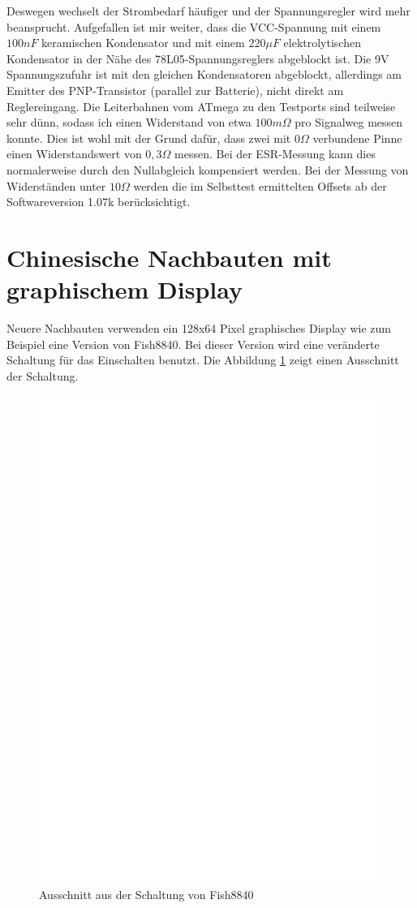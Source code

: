 Deswegen wechselt der Strombedarf häufiger und der Spannungsregler wird mehr beansprucht.
Aufgefallen ist mir weiter, dass die VCC-Spannung mit einem \(100nF\) keramischen Kondensator und mit
einem \(220\mu F\) elektrolytischen Kondensator in der Nähe des 78L05-Spannungsreglers abgeblockt ist.
Die 9V Spannungszufuhr ist mit den gleichen Kondensatoren abgeblockt, allerdings am Emitter des PNP-Transistor
(parallel zur Batterie), nicht direkt am Reglereingang.
Die Leiterbahnen vom ATmega zu den Testports sind teilweise sehr dünn, sodass ich einen Widerstand
von etwa \(100m \Omega\) pro Signalweg messen konnte. Dies ist wohl mit der Grund dafür, dass zwei
mit \(0 \Omega\) verbundene Pinne einen Widerstandswert von \(0,3 \Omega\) messen.
Bei der ESR-Messung kann dies normalerweise durch den Nullabgleich kompensiert werden.
Bei der Messung von Widerständen unter \(10 \Omega\) werden die im Selbsttest ermittelten Offsets 
ab der Softwareversion 1.07k berücksichtigt.

\section{Chinesische Nachbauten mit graphischem Display}
Neuere Nachbauten verwenden ein 128x64 Pixel graphisches Display wie zum Beispiel eine Version von Fish8840.
Bei dieser Version wird eine veränderte Schaltung für das Einschalten benutzt. Die Abbildung \ref{fig:Fish8840}
zeigt einen Ausschnitt der Schaltung.

\begin{figure}[H]
\centering
\includegraphics[width=12cm]{../FIG/Fish8840.eps}
\caption{Ausschnitt aus der Schaltung von Fish8840}
\label{fig:Fish8840}
\end{figure}

